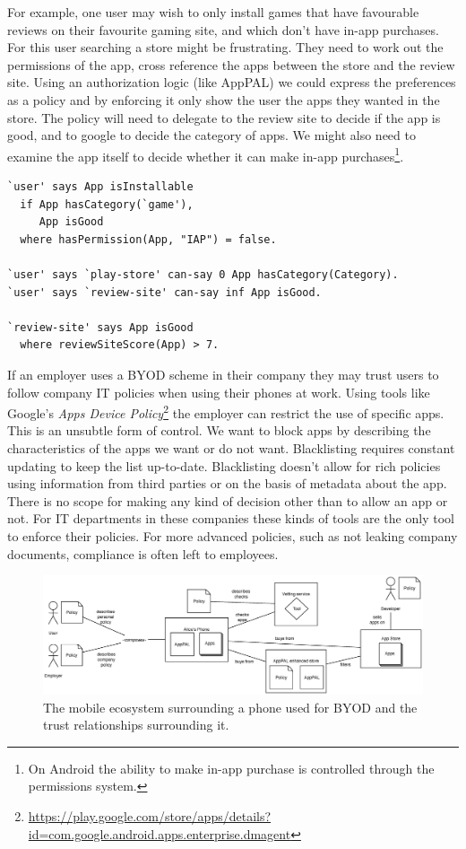 \documentclass[a4paper]{scrartcl}
\begin{document}
For example, one user may wish to only install games that have favourable reviews on their favourite gaming site, and which don't have in-app purchases.
For this user searching a store might be frustrating.
They need to work out the permissions of the app, cross reference the apps between the store and the review site.
Using an authorization logic (like AppPAL) we could express the preferences as a policy and by enforcing it only show the user the apps they wanted in the store.
The policy will need to delegate to the review site to decide if the app is good, and to google to decide the category of apps.
We might also need to examine the app itself to decide whether it can make in-app purchases\footnote{On Android the ability to make in-app purchase is controlled through the permissions system.}.
\begin{lstlisting}
`user' says App isInstallable
  if App hasCategory(`game'),
     App isGood
  where hasPermission(App, "IAP") = false.

`user' says `play-store' can-say 0 App hasCategory(Category).
`user' says `review-site' can-say inf App isGood.

`review-site' says App isGood
  where reviewSiteScore(App) > 7.
\end{lstlisting}

If an employer uses a \ac{BYOD} scheme in their company they may trust users to follow company IT policies when using their phones at work.
Using tools like Google's \emph{Apps Device Policy}\footnote{\url{https://play.google.com/store/apps/details?id=com.google.android.apps.enterprise.dmagent}} the employer can restrict the use of specific apps.
This is an unsubtle form of control.
We want to block apps by describing the characteristics of the apps we want or do not want.
Blacklisting requires constant updating to keep the list up-to-date.
Blacklisting doesn't allow for rich policies using information from third parties or on the basis of metadata about the app.
There is no scope for making any kind of decision other than to allow an app or not.
For IT departments in these companies these kinds of tools are the only tool to enforce their policies.
For more advanced policies, such as not leaking company documents, compliance is often left to employees.

\begin{figure}[]
  \centering
  \includegraphics[width=1.0\linewidth]{images/ecosystem.eps}
  \caption{The mobile ecosystem surrounding a phone used for \ac{BYOD} and the trust relationships surrounding it.}
  \label{fig:ecosystem}
\end{figure}
\end{document}
